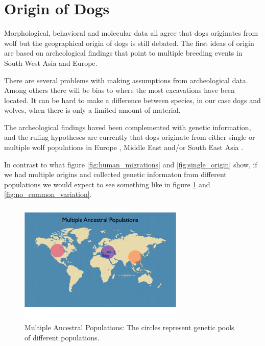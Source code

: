 \documentclass[a4paper,11pt]{kth-mag}
\begin{document}
\section{Origin of Dogs}

Morphological, behavioral and molecular data all agree that dogs originates from wolf \cite{clutton-brock95,vila97,wayne93} but the geographical origin of dogs is still debated. The first ideas of origin are based on archeological findings that point to multiple breeding events in South West Asia and Europe\cite{clutton-brock95,dayan94}.

There are several problems with making assumptions from archeological data. Among others there will be bias to where the most excavations have been located. It can be hard to make a difference between species, in our case dogs and wolves, when there is only a limited amount of material.

The archeological findings haved been complemented with genetic information, and the ruling hypotheses are currently that dogs originate from either single or multiple wolf populations in Europe \cite{benecke87,verginelli05}, Middle East \cite{gray10,vonholdt10} and/or South East Asia \cite{savo02, pang09, ding11}.

In contrast to what figure \ref{fig:human_migrations} and \ref{fig:single_origin} show, if we had multiple origins and collected genetic informaton from different populations we would expect to see something like in figure \ref{fig:multiple_origin} and \ref{fig:no_common_variation}.

\begin{figure}[ht]
	\centering
		\includegraphics[width=0.7\textwidth]{../pictures/Multiple_ancestors_1.jpg}
	\caption{Multiple Ancestral Populations: The circles represent genetic pools of different populations.}
	\label{fig:multiple_origin}
\end{figure}
\end{document}
